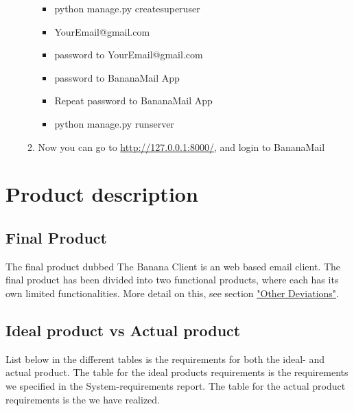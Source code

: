 \documentclass{article}
\begin{document}
\begin{itemize}
\begin{enumerate}
\begin{itemize}
        \item python manage.py createsuperuser
        
        \item {YourEmail}@gmail.com
        
        \item password to {YourEmail}@gmail.com
        
        \item password to BananaMail App
        
        \item Repeat password to BananaMail App
        
        \item python manage.py runserver
        \end{itemize}
        
        \item Now you can go to \url{http://127.0.0.1:8000/}, and login to BananaMail

    \end{enumerate}
\end{itemize}




\section*{Product description}

\subsection*{Final Product}
The final product dubbed The Banana Client is an web based email client. The final product has been divided into two functional products, where each has its own limited functionalities. More detail on this, see section \hyperref[sec:deviations]{"Other Deviations"}.

\subsection*{Ideal product vs Actual product}
List below in the different tables is the requirements for both the ideal- and actual product. The table for the ideal products requirements is the requirements we specified in the System-requirements report. The table for the actual product requirements is the we have realized.
\end{document}

